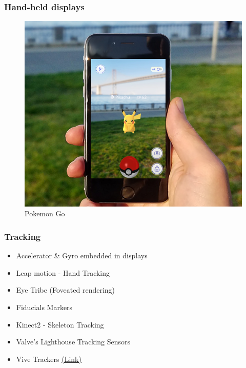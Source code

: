 \begin{frame}
	\frametitle{Hand-held displays}
	\begin{figure}
		\includegraphics[scale=0.25]{assets/pgo.png}
		\caption{Pokemon Go}
	\end{figure}
	
\end{frame}

\begin{frame}
	\frametitle{Tracking}
	\begin{itemize}
		\item Accelerator \& Gyro embedded in displays
		\item Leap motion - Hand Tracking
		\item Eye Tribe (Foveated rendering)
		\item Fiducials Markers
		\item Kinect2 - Skeleton Tracking
		\item Valve's Lighthouse Tracking Sensors
		\item Vive Trackers \href{https://www.youtube.com/watch?v=rJKO2WGSP_I}{(Link)}
	\end{itemize}
\end{frame}

